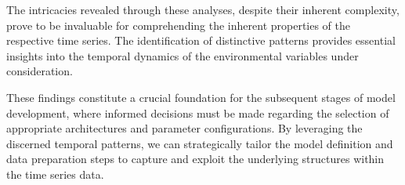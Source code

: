 The intricacies revealed through these analyses, despite their inherent complexity, prove to be invaluable for comprehending the inherent properties of the respective time series. The identification of distinctive patterns provides essential insights into the temporal dynamics of the environmental variables under consideration.

These findings constitute a crucial foundation for the subsequent stages of model development, where informed decisions must be made regarding the selection of appropriate architectures and parameter configurations. By leveraging the discerned temporal patterns, we can strategically tailor the model definition and data preparation steps to capture and exploit the underlying structures within the time series data.

